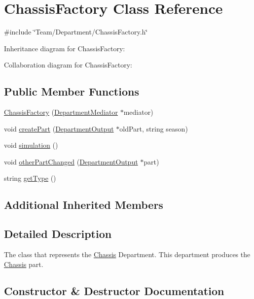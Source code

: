 \hypertarget{classChassisFactory}{}\section{Chassis\+Factory Class Reference}
\label{classChassisFactory}


{\ttfamily \#include \char`\"{}Team/\+Department/\+Chassis\+Factory.\+h\char`\"{}}



Inheritance diagram for Chassis\+Factory\+:


Collaboration diagram for Chassis\+Factory\+:
\subsection*{Public Member Functions}
\begin{DoxyCompactItemize}
\item 
\hyperlink{classChassisFactory_a14dc5cd1b2491cc6fb61084eeec2a169}{Chassis\+Factory} (\hyperlink{classDepartmentMediator}{Department\+Mediator} $\ast$mediator)
\item 
void \hyperlink{classChassisFactory_aeeb7d210e8c3ca1a3e3b2998705b0d90}{create\+Part} (\hyperlink{classDepartmentOutput}{Department\+Output} $\ast$old\+Part, string season)
\item 
void \hyperlink{classChassisFactory_a80d7b3f0cb610967088f6ed89a71b2bb}{simulation} ()
\item 
void \hyperlink{classChassisFactory_a15eb17dfcb995b9dcc75d4908e49a17f}{other\+Part\+Changed} (\hyperlink{classDepartmentOutput}{Department\+Output} $\ast$part)
\item 
string \hyperlink{classChassisFactory_af038789501da489aeccb19520dc09686}{get\+Type} ()
\end{DoxyCompactItemize}
\subsection*{Additional Inherited Members}


\subsection{Detailed Description}
The class that represents the \hyperlink{classChassis}{Chassis} Department. This department produces the \hyperlink{classChassis}{Chassis} part. 

\subsection{Constructor \& Destructor Documentation}
\mbox{\label{classChassisFactory_a14dc5cd1b2491cc6fb61084eeec2a169}} 
